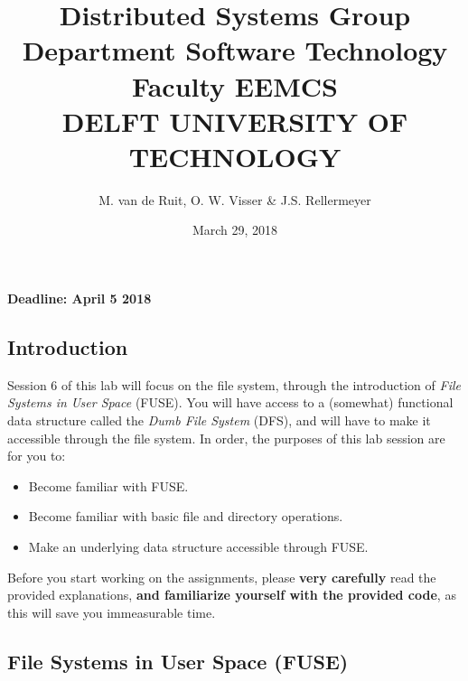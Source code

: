 \documentclass [a4,twoside,11pt] {article}
\begin{document}
    
    \title{
       \flushleft
       {\small
          {Distributed Systems Group \\
           Department Software Technology\\
           Faculty EEMCS\\
           DELFT UNIVERSITY OF TECHNOLOGY\\}}
    }
    \author{M. van de Ruit, O. W. Visser \& J.S. Rellermeyer}
    \date{March 29, 2018}
    \maketitle
    
    \begin{center}
    \textbf{Deadline: April 5 2018}
    \end{center}
    
    \setcounter{secnumdepth}{1}
    
    \subsection{Introduction}

    Session 6 of this lab will focus on the file system, through the introduction of \textit{File Systems in User Space} (FUSE). You will have access to a (somewhat) functional data structure called the \textit{Dumb File System} (DFS), and will have to make it accessible through the file system. In order, the purposes of this lab session are for you to:

    \begin{itemize}
        \itemsep1pt\parskip0pt
        \item Become familiar with FUSE.
        \item Become familiar with basic file and directory operations.
        \item Make an underlying data structure accessible through FUSE.
    \end{itemize}

    Before you start working on the assignments, please \textbf{very carefully} read the provided explanations, \textbf{and familiarize yourself with the provided code}, as this will save you immeasurable time.

    \newpage
    \subsection{File Systems in User Space (FUSE)}
\end{document}
